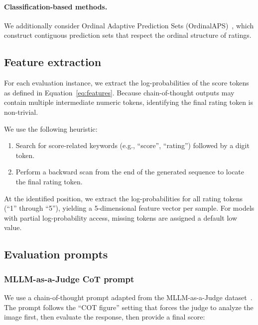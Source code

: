 \documentclass{article}
\begin{document}
\paragraph{Classification-based methods.}
We additionally consider Ordinal Adaptive Prediction Sets (OrdinalAPS)~\citep{lu2022fair}, which construct contiguous prediction sets that respect the ordinal structure of ratings.

\subsection{Feature extraction}
\label{app:feature_extraction}

For each evaluation instance, we extract the log-probabilities of the score tokens as defined in Equation~\ref{eq:features}. Because chain-of-thought outputs may contain multiple intermediate numeric tokens, identifying the final rating token is non-trivial.

We use the following heuristic:
\begin{enumerate}
\item Search for score-related keywords (e.g., ``score'', ``rating'') followed by a digit token.
\item Perform a backward scan from the end of the generated sequence to locate the final rating token.
\end{enumerate}

At the identified position, we extract the log-probabilities for all rating tokens (``1'' through ``5''), yielding a 5-dimensional feature vector per sample. For models with partial log-probability access, missing tokens are assigned a default low value.

\subsection{Evaluation prompts}
\label{app:prompts}

\subsubsection{MLLM-as-a-Judge CoT prompt}

We use a chain-of-thought prompt adapted from the MLLM-as-a-Judge dataset~\citep{chen2024mllmasajudge}. The prompt follows the ``COT figure'' setting that forces the judge to analyze the image first, then evaluate the response, then provide a final score:
\end{document}
